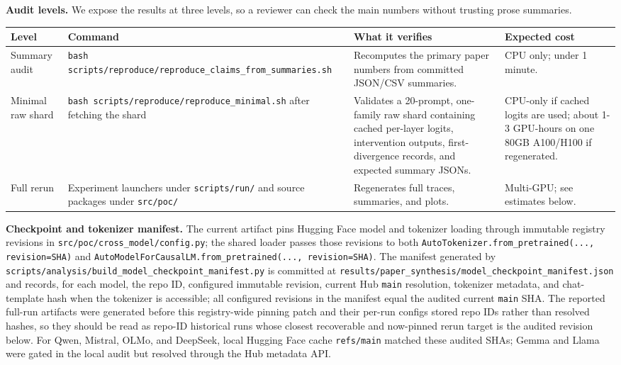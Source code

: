 \documentclass[11pt]{article}
\begin{document}
\textbf{Audit levels.} We expose the results at three levels, so a reviewer can check the main numbers without trusting prose summaries.

\begin{table}[t]
\centering
\small
\setlength{\tabcolsep}{3pt}
\begin{tabularx}{\linewidth}{@{}>{\raggedright\arraybackslash}X >{\raggedright\arraybackslash}X >{\raggedright\arraybackslash}X >{\raggedright\arraybackslash}X@{}}
\toprule
Level & Command & What it verifies & Expected cost \\
\midrule
Summary audit & \texttt{bash scripts/reproduce/reproduce\_claims\_from\_summaries.sh} & Recomputes the primary paper numbers from committed JSON/CSV summaries. & CPU only; under 1 minute. \\
Minimal raw shard & \texttt{bash scripts/reproduce/reproduce\_minimal.sh} after fetching the shard & Validates a 20-prompt, one-family raw shard containing cached per-layer logits, intervention outputs, first-divergence records, and expected summary JSONs. & CPU-only if cached logits are used; about 1-3 GPU-hours on one 80GB A100/H100 if regenerated. \\
Full rerun & Experiment launchers under \texttt{scripts/run/} and source packages under \texttt{src/poc/} & Regenerates full traces, summaries, and plots. & Multi-GPU; see estimates below. \\
\bottomrule
\end{tabularx}
\end{table}

\textbf{Checkpoint and tokenizer manifest.} The current artifact pins Hugging Face model and tokenizer loading through immutable registry revisions in \texttt{src/poc/cross\_model/config.py}; the shared loader passes those revisions to both \texttt{AutoTokenizer.from\_pretrained(..., revision=SHA)} and \texttt{AutoModelForCausalLM.from\_pretrained(..., revision=SHA)}. The manifest generated by \texttt{scripts/analysis/build\_model\_checkpoint\_manifest.py} is committed at \texttt{results/paper\_synthesis/model\_checkpoint\_manifest.json} and records, for each model, the repo ID, configured immutable revision, current Hub \texttt{main} resolution, tokenizer metadata, and chat-template hash when the tokenizer is accessible; all configured revisions in the manifest equal the audited current \texttt{main} SHA. The reported full-run artifacts were generated before this registry-wide pinning patch and their per-run configs stored repo IDs rather than resolved hashes, so they should be read as repo-ID historical runs whose closest recoverable and now-pinned rerun target is the audited revision below. For Qwen, Mistral, OLMo, and DeepSeek, local Hugging Face cache \texttt{refs/main} matched these audited SHAs; Gemma and Llama were gated in the local audit but resolved through the Hub metadata API.
\end{document}
